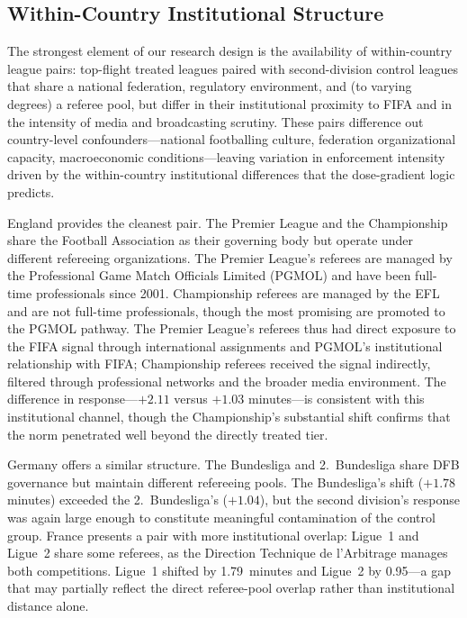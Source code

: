 \subsection{Within-Country Institutional Structure}
\label{sec:background:within}

The strongest element of our research design is the availability of
within-country league pairs: top-flight treated leagues paired with
second-division control leagues that share a national federation,
regulatory environment, and (to varying degrees) a referee pool, but
differ in their institutional proximity to FIFA and in the intensity of
media and broadcasting scrutiny. These pairs difference out
country-level confounders---national footballing culture, federation
organizational capacity, macroeconomic conditions---leaving variation
in enforcement intensity driven by the within-country institutional
differences that the dose-gradient logic predicts.

England provides the cleanest pair. The Premier League and the
Championship share the Football Association as their governing body but
operate under different refereeing organizations. The Premier League's
referees are managed by the Professional Game Match Officials Limited
(PGMOL) and have been full-time professionals since 2001. Championship
referees are managed by the EFL and are not full-time professionals,
though the most promising are promoted to the PGMOL pathway. The
Premier League's referees thus had direct exposure to the FIFA signal
through international assignments and PGMOL's institutional relationship
with FIFA; Championship referees received the signal indirectly, filtered
through professional networks and the broader media environment.
The difference in response---$+2.11$ versus $+1.03$ minutes---is
consistent with this institutional channel, though the Championship's
substantial shift confirms that the norm penetrated well beyond the
directly treated tier.

Germany offers a similar structure. The Bundesliga and 2.~Bundesliga
share DFB governance but maintain different refereeing pools. The
Bundesliga's shift ($+1.78$ minutes) exceeded the 2.~Bundesliga's
($+1.04$), but the second division's response was again large enough
to constitute meaningful contamination of the control group. France
presents a pair with more institutional overlap: Ligue~1 and Ligue~2
share some referees, as the Direction Technique de l'Arbitrage manages
both competitions. Ligue~1 shifted by 1.79~minutes and Ligue~2 by
0.95---a gap that may partially reflect the direct referee-pool
overlap rather than institutional distance alone.

